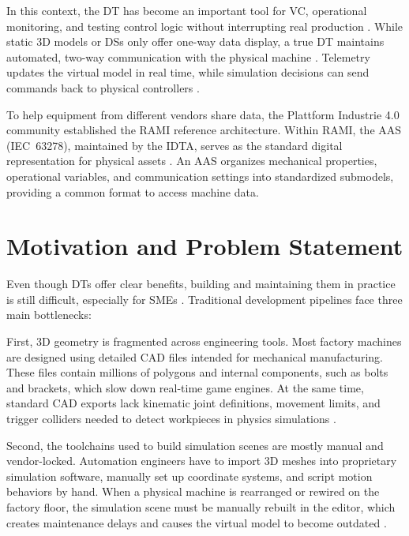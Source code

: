 In this context, the \gls{DT} has become an important tool for \gls{VC}, operational monitoring, and testing control logic without interrupting real production \cite{Tao2019}. While static 3D models or \glspl{DS} only offer one-way data display, a true \gls{DT} maintains automated, two-way communication with the physical machine \cite{Kritzinger2018}. Telemetry updates the virtual model in real time, while simulation decisions can send commands back to physical controllers \cite{Pajpach2023}.

To help equipment from different vendors share data, the Plattform Industrie 4.0 community established the \gls{RAMI} reference architecture. Within \gls{RAMI}, the \gls{AAS} (\gls{IEC}~63278), maintained by the \gls{IDTA}, serves as the standard digital representation for physical assets \cite{Lu2025}. An \gls{AAS} organizes mechanical properties, operational variables, and communication settings into standardized submodels, providing a common format to access machine data.

\section{Motivation and Problem Statement}
\label{sec:motivation}

Even though \glspl{DT} offer clear benefits, building and maintaining them in practice is still difficult, especially for \glspl{SME} \cite{Schaper2025}. Traditional development pipelines face three main bottlenecks:

First, 3D geometry is fragmented across engineering tools. Most factory machines are designed using detailed \gls{CAD} files intended for mechanical manufacturing. These files contain millions of polygons and internal components, such as bolts and brackets, which slow down real-time game engines. At the same time, standard \gls{CAD} exports lack kinematic joint definitions, movement limits, and trigger colliders needed to detect workpieces in physics simulations \cite{Chowdhury2025}.

Second, the toolchains used to build simulation scenes are mostly manual and vendor-locked. Automation engineers have to import 3D meshes into proprietary simulation software, manually set up coordinate systems, and script motion behaviors by hand. When a physical machine is rearranged or rewired on the factory floor, the simulation scene must be manually rebuilt in the editor, which creates maintenance delays and causes the virtual model to become outdated \cite{Alexopoulos2025}.

